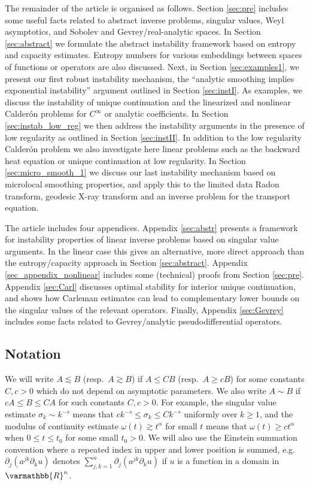 \documentclass[12pt,twoside]{amsart}
\numberwithin{equation}{section}
\renewcommand{\leq}{\leqslant}
\renewcommand{\geq}{\geqslant}
\renewcommand{\mathbb}{\varmathbb}
\newcommand {\p} {\partial}
\newcommand{\mR}{\mathbb{R}}                    %
\begin{document}
The remainder of the article is organised as follows. Section \ref{sec:pre} includes some useful facts related to abstract inverse problems, singular values, Weyl asymptotics, and Sobolev and Gevrey/real-analytic spaces. In Section \ref{sec:abstract} we formulate the abstract instability framework based on entropy and capacity estimates. Entropy numbers for various embeddings between spaces of functions or operators are also discussed. Next, in Section \ref{sec:examples1}, we present our first robust instability mechanism, the ``analytic smoothing implies exponential instability'' argument outlined in Section \ref{sec:instI}. As examples, we discuss the instability of unique continuation and the linearized and nonlinear Calder\'on problems for $C^{\infty}$ or analytic coefficients. In Section \ref{sec:instab_low_reg} we then address the instability arguments in the presence of low regularity as outlined in Section \ref{sec:instII}. In addition to the low regularity Calder\'on problem we also investigate here linear problems such as the backward heat equation or unique continuation at low regularity. In Section \ref{sec:micro_smooth_1} we discuss our last instability mechanism based on microlocal smoothing properties, and apply this to the limited data Radon transform, geodesic X-ray transform and an inverse problem for the transport equation.

The article includes four appendices. Appendix \ref{sec:abstr} presents a framework for instability properties of linear inverse problems based on singular value arguments. In the linear case this gives an alternative, more direct approach than the entropy/capacity approach in Section \ref{sec:abstract}. Appendix \ref{sec_appendix_nonlinear} includes some (technical) proofs from Section \ref{sec:pre}. Appendix \ref{sec:Carl} discusses optimal stability for interior unique continuation, and shows how Carleman estimates can lead to complementary lower bounds on the singular values of the relevant operators. Finally, Appendix \ref{sec:Gevrey} includes some facts related to Gevrey/analytic pseudodifferential operators.

\subsection*{Notation}
We will write $A \lesssim B$ (resp.\ $A \gtrsim B$) if $A \leq C B$ (resp.\ $A \geq c B$) for some constants $C, c > 0$ which do not depend on asymptotic parameters. We also write $A \sim B$ if $c A \leq B \leq C A$ for such constants $C, c > 0$. For example, the singular value estimate $\sigma_k \sim k^{-s}$ means that $c k^{-s} \leq \sigma_k \leq C k^{-s}$ uniformly over $k \geq 1$, and the modulus of continuity estimate $\omega(t) \gtrsim t^{\alpha}$ for small $t$ means that $\omega(t) \geq c t^{\alpha}$ when $0 \leq t \leq t_0$ for some small $t_0 > 0$. We will also use the Einstein summation convention where a repeated index in upper and lower position is summed, e.g.\ $\p_j(a^{jk} \p_k u)$ denotes $\sum_{j,k=1}^n \p_j(a^{jk} \p_k u)$ if $u$ is a function in a domain in $\mR^n$.
\end{document}
